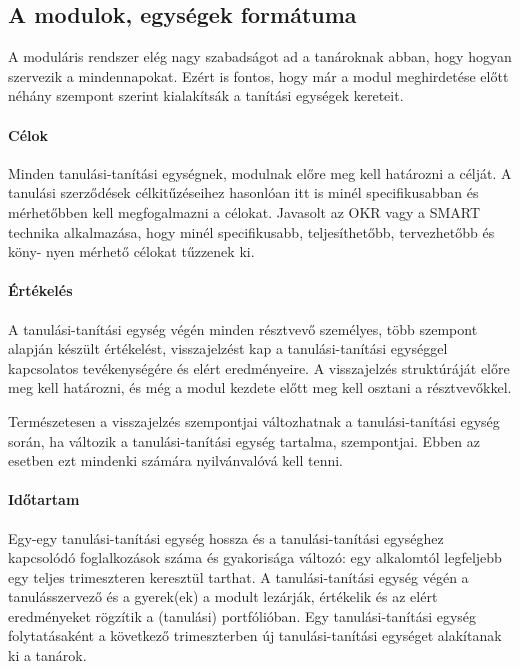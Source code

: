 \hypertarget{a-modulok-egysegek-formatuma}{%
\subsection{A modulok, egységek
formátuma}\label{a-modulok-egysegek-formatuma}}

A moduláris rendszer elég nagy szabadságot ad a tanároknak abban, hogy
hogyan szervezik a mindennapokat. Ezért is fontos, hogy már a modul
meghirdetése előtt néhány szempont szerint kialakítsák a tanítási
egységek kereteit.

\hypertarget{celok}{%
\paragraph{Célok}\label{celok}}

Minden tanulási-tanítási egységnek, modulnak előre meg kell határozni a
célját. A tanulási szerződések célkitűzéseihez hasonlóan itt is minél
specifikusabban és mérhetőbben kell megfogalmazni a célokat. Javasolt az
OKR {\autocite{Doerr2018}} vagy a SMART {\autocite{Doran1981}} technika
alkalmazása, hogy minél specifikusabb, teljesíthetőbb, tervezhetőbb és
köny-\break
nyen mérhető célokat tűzzenek ki.

\hypertarget{ertekeles}{%
\paragraph{Értékelés}\label{ertekeles}}

A tanulási-tanítási egység végén minden résztvevő személyes, több
szempont alapján készült értékelést, visszajelzést kap a
tanulási-ta\-ní\-tá\-si egységgel kapcsolatos tevékenységére és elért
eredményeire. A visszajelzés struktúráját előre meg kell határozni, és
még a modul kezdete előtt meg kell osztani a résztvevőkkel.

Természetesen a visszajelzés szempontjai változhatnak a
tanulási-ta\-ní\-tá\-si egység során, ha változik a tanulási-tanítási egység
tartalma, szempontjai. Ebben az esetben ezt mindenki számára nyilvánvalóvá
kell tenni.

\hypertarget{idotartam}{%
\paragraph{Időtartam}\label{idotartam}}

Egy-egy tanulási-tanítási egység hossza és a tanulási-tanítási egységhez
kapcsolódó foglalkozások száma és gyakorisága változó: egy alkalomtól
legfeljebb egy teljes trimeszteren keresztül tarthat. A
tanulási-tanítási egység végén a tanulásszervező és a gyerek(ek) a
modult lezárják, értékelik és az elért eredményeket rögzítik a
(tanulási) portfólióban. Egy tanulási-tanítási egység folytatásaként a
következő trimeszterben új tanulási-tanítási egységet alakítanak ki a
tanárok.

